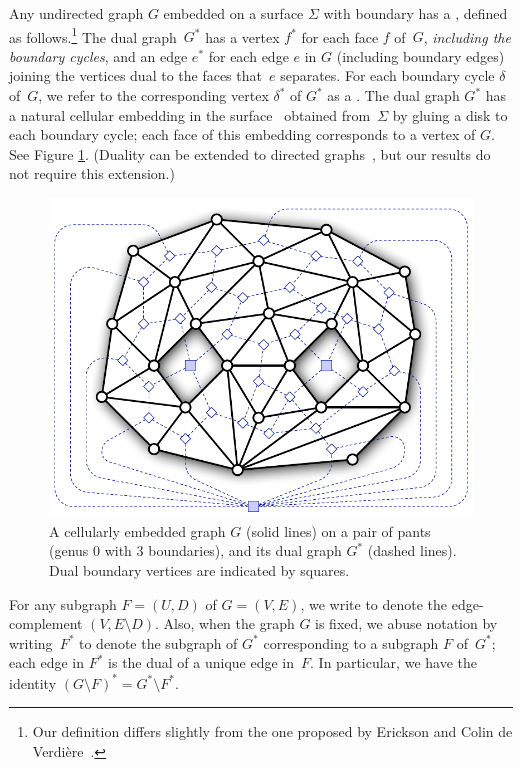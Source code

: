 \documentclass[11pt,twoside]{article}
\begin{document}
Any undirected graph $G$ embedded on a surface $\Sigma$ with boundary has a , defined as follows.\footnote{Our definition differs slightly from the one proposed by Erickson and Colin de Verdi\`ere~\cite{octagons}.}  The dual graph~$G^*$ has a vertex $f^*$ for each face $f$ of~$G$, \emph{including the boundary cycles}, and an edge $e^*$ for each edge $e$ in $G$ (including boundary edges) joining the vertices dual to the faces that~$e$ separates.  For each boundary cycle $\delta$ of~$G$, we refer to the corresponding vertex $\delta^*$ of $G^*$ as a .  The dual graph $G^*$ has a natural cellular embedding in the surface~\EMPH{$\Sigma^\bullet$} obtained from~$\Sigma$ by gluing a disk to each boundary cycle; each face of this embedding corresponds to a vertex of $G$.  See Figure \ref{fig:duality}.  (Duality can be extended to directed graphs~\cite{surflow}, but our results do not require this extension.)


\begin{figure}[htb]
\centering
\includegraphics[scale=0.45]{Fig/pants}
\caption{A cellularly embedded graph $G$ (solid lines) on a pair of pants (genus 0 with 3 boundaries), and its dual graph $G^*$ (dashed lines).  Dual boundary vertices are indicated by squares.}
\label{fig:duality}
\end{figure}
 
For any subgraph $F = (U,D)$ of $G = (V,E)$, we write  to denote the edge-complement $(V, {E\setminus D})$.  Also, when the graph $G$ is fixed, we abuse notation by writing~$F^*$ to denote the subgraph of $G^*$ corresponding to a subgraph $F$ of~$G^*$; each edge in $F^*$ is the dual of a unique edge in~$F$.  In particular, we have the identity $(G\setminus F)^* = G^* \setminus F^*$.
\end{document}
